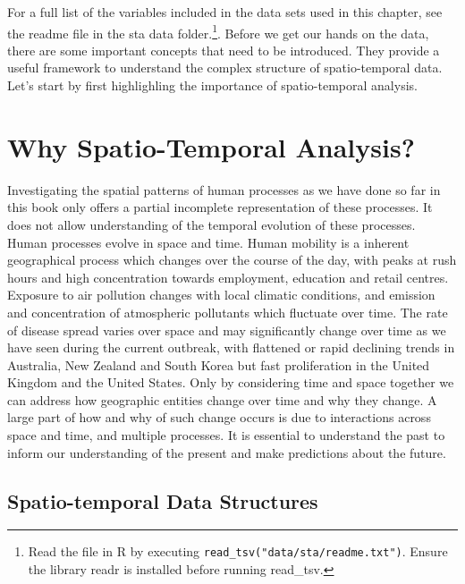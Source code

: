 \documentclass[
  letterpaper,
  krantz2]{style/krantz}
\begin{document}
For a full list of the variables included in the data sets used in this
chapter, see the readme file in the sta data folder.\footnote{Read the
  file in R by executing \texttt{read\_tsv("data/sta/readme.txt")}.
  Ensure the library readr is installed before running read\_tsv.}.
Before we get our hands on the data, there are some important concepts
that need to be introduced. They provide a useful framework to
understand the complex structure of spatio-temporal data. Let's start by
first highlighling the importance of spatio-temporal analysis.

\hypertarget{why-spatio-temporal-analysis}{%
\section{Why Spatio-Temporal
Analysis?}\label{why-spatio-temporal-analysis}}

Investigating the spatial patterns of human processes as we have done so
far in this book only offers a partial incomplete representation of
these processes. It does not allow understanding of the temporal
evolution of these processes. Human processes evolve in space and time.
Human mobility is a inherent geographical process which changes over the
course of the day, with peaks at rush hours and high concentration
towards employment, education and retail centres. Exposure to air
pollution changes with local climatic conditions, and emission and
concentration of atmospheric pollutants which fluctuate over time. The
rate of disease spread varies over space and may significantly change
over time as we have seen during the current outbreak, with flattened or
rapid declining trends in Australia, New Zealand and South Korea but
fast proliferation in the United Kingdom and the United States. Only by
considering time and space together we can address how geographic
entities change over time and why they change. A large part of how and
why of such change occurs is due to interactions across space and time,
and multiple processes. It is essential to understand the past to inform
our understanding of the present and make predictions about the future.

\hypertarget{spatio-temporal-data-structures}{%
\subsection{Spatio-temporal Data
Structures}\label{spatio-temporal-data-structures}}
\end{document}
